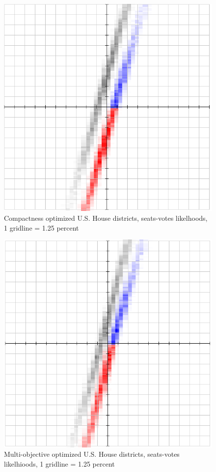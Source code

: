 \documentclass[preprint,12pt]{article}
\begin{document}
\begin{figure}[htb!]
    \begin{center}
        \includegraphics[scale=0.5]{Figures/original_method/BD__ush.png}
        \caption{Compactness optimized U.S. House districts, seats-votes likelhoods, 1 gridline = 1.25 percent}\label{fig:BD_ush}
    \end{center}
\end{figure}
\begin{figure}[htb!]
    \begin{center}
        \includegraphics[scale=0.5]{Figures/original_method/SM__ush.png}
        \caption{Multi-objective optimized U.S. House districts, seats-votes likelhioods, 1 gridline = 1.25 percent}\label{fig:SM_ush}
    \end{center}
\end{figure}
\end{document}
